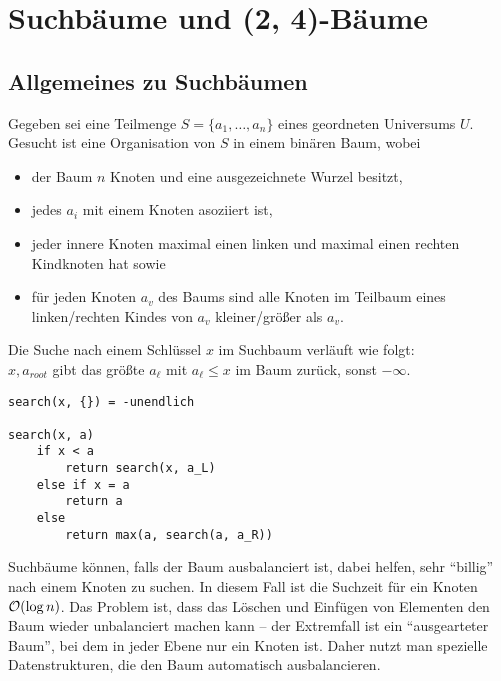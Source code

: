\chapter{%
    Suchbäume und (2, 4)-Bäume%
}

\section{%
    Allgemeines zu Suchbäumen%
}

Gegeben sei eine Teilmenge $S = \{a_1, \dotsc, a_n\}$ eines geordneten
Universums $U$. \\
Gesucht ist eine Organisation von $S$ in einem binären Baum, wobei
\begin{itemize}
    \item
    der Baum $n$ Knoten und eine ausgezeichnete Wurzel besitzt,

    \item
    jedes $a_i$ mit einem Knoten asoziiert ist,

    \item
    jeder innere Knoten maximal einen linken und maximal einen rechten
    Kindknoten hat sowie

    \item
    für jeden Knoten $a_v$ des Baums sind alle Knoten im Teilbaum eines
    linken/rechten Kindes von $a_v$ kleiner/größer als $a_v$.
\end{itemize}

\linie

Die Suche nach einem Schlüssel $x$ im Suchbaum verläuft wie folgt: \\
$x, a_{root}$\code{)} gibt das größte $a_\ell$ mit
$a_\ell \le x$ im Baum zurück, sonst $-\infty$.

\begin{lstlisting}
search(x, {}) = -unendlich

search(x, a)
    if x < a
        return search(x, a_L)
    else if x = a
        return a
    else
        return max(a, search(a, a_R))
\end{lstlisting}

Suchbäume können, falls der Baum ausbalanciert ist, dabei helfen, sehr
"`billig"' nach einem Knoten zu suchen.
In diesem Fall ist die Suchzeit für ein Knoten $\mathcal{O}(\log n)$.
Das Problem ist, dass das Löschen und Einfügen von Elementen den Baum
wieder unbalanciert machen kann -- der Extremfall ist ein
"`ausgearteter Baum"', bei dem in jeder Ebene nur ein Knoten ist.
Daher nutzt man spezielle Datenstrukturen, die den Baum automatisch
ausbalancieren.

